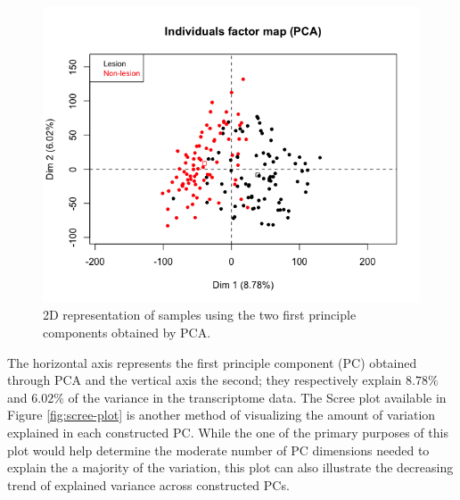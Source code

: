 \documentclass[journal, a4paper]{IEEEtran}
\begin{document}
\begin{figure}[!htp]
    \begin{center}
    \begin{minipage}{0.5 \textwidth}
      \centering
      \includegraphics[width=\textwidth]{../exploratory-data-analysis/pca-plot.png}
      \caption{2D representation of samples using the two first principle components obtained by PCA.}
      \label{fig:pca}
    \end{minipage}
  \end{center}
\end{figure}


The horizontal axis represents the first principle component (PC) obtained through PCA and the vertical axis the second; they respectively explain $8.78\%$ and $6.02\%$ of the variance in the transcriptome data. The Scree plot available in Figure \ref{fig:scree-plot} is another method of visualizing the amount of variation explained in each constructed PC. While the one of the primary purposes of this plot would help determine the moderate number of PC dimensions needed to explain the a majority of the variation, this plot can also illustrate the decreasing trend of explained variance across constructed PCs.\\%
\end{document}
